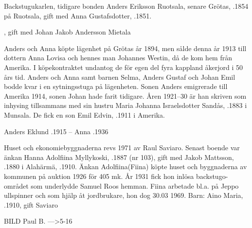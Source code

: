 Backstugukarlen, tidigare bonden Anders Eriksson Ruotsala, senare Grötas, .1854 på Ruotsala, gift med Anna Gustafsdotter, .1851.
\begin{jhchildren}
  \item {}
  \item {}
  \item {}
  \item {}
  \item {}, gift med Johan Jakob Andersson Mietala
  \item {}
  \item {}
\end{jhchildren}
Anders och Anna köpte lägenhet på Grötas år 1894, men sålde denna år 1913 till dottern Anna Lovisa och hennes man Johannes Westin, då de kom hem från Amerika. I köpekontraktet undantog de för egen del fyra kappland åkerjord i 50 års tid. Anders och Anna samt barnen Selma, Anders Gustaf och Johan Emil bodde kvar i en sytningsstuga på lägenheten. Sonen Anders emigrerade till Amerika 1914, sonen Johan hade farit tidigare. Åren 1921–30 är han skriven  som inhysing 				tillsammans med sin hustru Maria Johanna Israelsdotter Sandås, .1883 i Munsala. De fick en son Emil Edvin, .1911 i Amerika.

Anders Eklund .1915  --  Anna .1936




Huset och ekonomiebyggnaderna revs 1971 av Raul Saviaro. Senast boende var änkan Hanna Adolfiina Myllykoski, .1887 (nr 103), gift med Jakob Mattsson, .1880 i Alahärmä, .1910. Änkan Adolfiina(Fiina) köpte huset och byggnaderna av kommunen på auktion 1926 för 405 mk. År 1931 fick hon inlösa backstugo-området som underlydde Samuel Roos hemman. Fiina arbetade bl.a. på Jeppo ullspinner och som hjälp åt jordbrukare, hon dog 30.03 1969.  Barn:  Aino Maria, .1910, gift Saviaro


BILD Paul B. --->5-16

